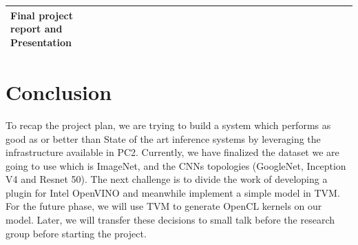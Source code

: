\documentclass[titlepage]{report}
\begin{document}
\begin{table}[ht]
\begin{adjustbox}{width=1.3\textwidth}
\begin{tabular}{|l|l|l|l|l|l|l|l|l|l|l|l|l|l|l|l|l|l|l|l|l|l|l|l|l|l|l|l|l|}
Final project report and Presentation        &  &  &                          &                          &                          &                          &                          &                          &                          &                          &                          &                          &                          &                          &                          &                          &                          &                          &                          &                          &                          & \cellcolor[HTML]{32CB00} & \cellcolor[HTML]{32CB00} & \cellcolor[HTML]{32CB00} & \cellcolor[HTML]{32CB00} & \cellcolor[HTML]{32CB00} &  &  \\ \hline
\end{tabular}
\end{adjustbox}
\end{table}


\chapter{Conclusion}

To recap the project plan, we are trying to build a system which performs as good as or better than State of the art inference systems by leveraging the infrastructure available in PC2. Currently, we have finalized the dataset we are going to use which is ImageNet, and the CNNs topologies (GoogleNet, Inception V4 and Resnet 50). The next challenge is to divide the work of developing a plugin for Intel OpenVINO and meanwhile implement a simple model in TVM. For the future phase, we will use TVM to generate OpenCL kernels on our model. Later, we will transfer these decisions to small talk before the research group before starting the project.

\end{document}
